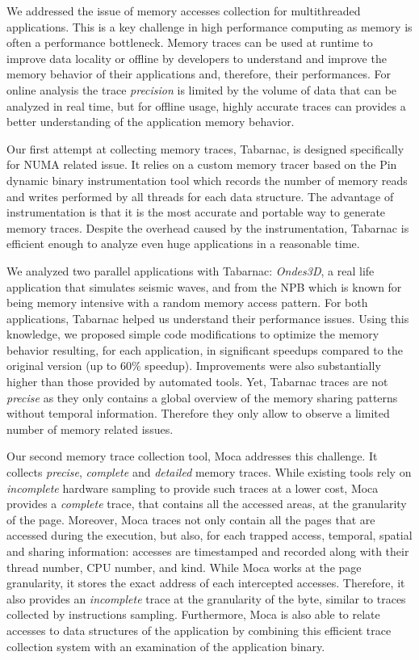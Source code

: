 We addressed the issue of memory accesses collection for multithreaded applications.
This is a key challenge in high performance computing as memory is often a performance bottleneck.
Memory traces can be used at runtime to improve data locality or offline by developers to understand and improve the memory behavior of their applications and, therefore, their performances.
For online analysis the trace \emph{precision} is limited by the volume of data that can be analyzed in real time, but for offline usage, highly accurate traces can provides a better understanding of the application memory behavior.

Our first attempt at collecting memory traces, \gls{Tabarnac}, is designed specifically for \gls{NUMA} related issue.
It relies on a custom memory tracer based on the Pin dynamic binary instrumentation tool which records the number of memory reads and writes performed by all threads for each data structure.
The advantage of instrumentation is that it is the most accurate and portable way to generate memory traces.
Despite the overhead caused by the instrumentation, \gls{Tabarnac} is efficient enough to analyze even huge applications in a reasonable time.

We analyzed two parallel applications with \gls{Tabarnac}: \emph{Ondes3D}, a real life application that
simulates seismic waves, and \IS from the \gls{NPB} which is known for being memory intensive with a random memory access pattern.
For both applications, \gls{Tabarnac} helped us understand their performance issues.
Using this knowledge, we proposed simple code modifications to optimize the memory behavior resulting, for each application, in significant speedups compared to the original version (up to $60\%$ speedup).
Improvements were also substantially higher than those provided by automated tools.
Yet, \gls{Tabarnac} traces are not \emph{precise} as they only contains a global overview of the memory sharing patterns without temporal information.
Therefore they only allow to observe a limited number of memory related issues.

Our second memory trace collection tool, \gls{Moca} addresses this challenge.
It  collects \emph{precise}, \emph{complete} and \emph{detailed} memory traces.
While existing tools rely on \emph{incomplete} hardware sampling to provide such traces at a lower cost, \gls{Moca} provides a \emph{complete} trace, that contains all the accessed areas, at the granularity of the page.
Moreover, \gls{Moca} traces not only contain all the pages that are accessed during the execution, but also, for each trapped access, temporal, spatial and sharing information: accesses are timestamped and recorded along with their thread number, CPU number, and kind.
While \gls{Moca} works at the page granularity, it stores the exact address of each intercepted accesses.
Therefore, it also provides an \emph{incomplete} trace at the granularity of the byte, similar to traces collected by instructions sampling.
Furthermore, \gls{Moca} is also able to relate accesses to data structures of the application by combining this efficient trace collection system with an examination of the application binary.

